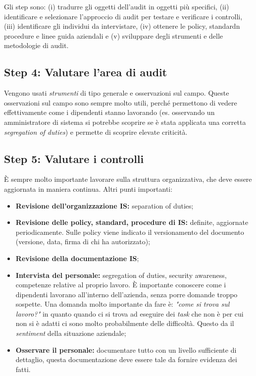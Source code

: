 Gli step sono: (i) tradurre gli oggetti dell'audit in oggetti più specifici, 
(ii) identificare e selezionare l'approccio di audit per testare e verificare i 
controlli, (iii) identificare gli individui da intervistare, (iv) ottenere le 
policy, standardn procedure e linee guida aziendali e (v) sviluppare degli 
strumenti e delle metodologie di audit.

\subsection{Step 4: Valutare l'area di audit}

Vengono usati \textit{strumenti} di tipo generale e osservazioni sul campo. 
Queste osservazioni sul campo sono sempre molto utili, perché permettono di 
vedere effettivamente come i dipendenti stanno lavorando (es. osservando 
un amministratore di sistema si potrebbe scoprire se è stata applicata una 
corretta \textit{segregation of duties}) e permette di scoprire elevate 
criticità.

\subsection{Step 5: Valutare i controlli}

È sempre molto importante lavorare sulla struttura organizzativa, che deve 
essere aggiornata in maniera continua.
Altri punti importanti:
\begin{itemize}
\item \textbf{Revisione dell'organizzazione IS:} separation of duties;
\item \textbf{Revisione delle policy, standard, procedure di IS:} definite, aggiornate 
periodicamente. Sulle policy viene indicato il versionamento del documento 
(versione, data, firma di chi ha autorizzato);
\item \textbf{Revisione della documentazione IS};
\item \textbf{Intervista del personale:} segregation of duties, security awareness, 
competenze relative al proprio lavoro. È importante conoscere come i dipendenti 
lavorano all'interno dell'azienda, senza porre domande troppo sospette. Una 
domanda molto importante da fare è: \textit{"come si trova sul lavoro?"} in 
quanto quando ci si trova ad eseguire dei \textit{task} che non è per cui non 
si è adatti ci sono molto probabilmente delle difficoltà. Questo da il 
\textit{sentiment} della situazione aziendale;
\item \textbf{Osservare il personale:} documentare tutto con un livello 
sufficiente di dettaglio, questa documentazione deve essere tale 
da fornire evidenza dei fatti.
\end{itemize}


